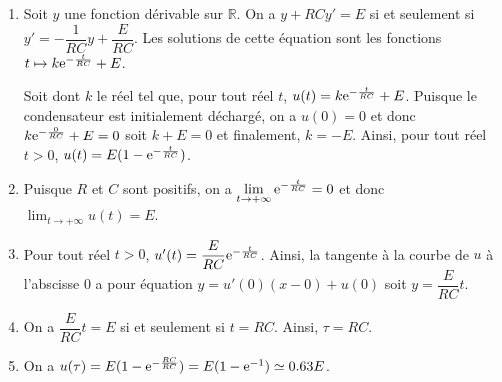 \documentclass[11pt,fleqn, openany]{book} %
\begin{document}
\begin{solution}\hspace{0pt}
\begin{enumerate}\item Soit \(y\) une fonction dérivable sur \(\mathbb{R}\). On a \(y+RCy'=E\) si et seulement si \(y'=-\dfrac{1}{RC}y+\dfrac{E}{RC}\). Les solutions de cette équation sont les fonctions \(t \mapsto k\mathrm{e}^{-\frac{t}{RC}}+E\). 

Soit dont \(k\) le réel tel que, pour tout réel \(t\), \(u(t)=k\mathrm{e}^{-\frac{t}{RC}}+E\). Puisque le condensateur est initialement déchargé, on a \(u(0)=0\) et donc \(k\mathrm{e}^{-\frac{0}{RC}}+E=0\) soit \(k+E=0\) et finalement, \(k=-E\). Ainsi, pour tout réel \(t>0\), \(u(t)=E(1-\mathrm{e}^{-\frac{t}{RC}})\).
	\item Puisque \(R\) et \(C\) sont positifs, on a \(\displaystyle\lim_{t \to + \infty}\mathrm{e}^{-\frac{t}{RC}}=0\) et donc \(\displaystyle\lim_{t \to +\infty}u(t)=E\).
	\item Pour tout réel \(t>0\), \(u'(t)=\dfrac{E}{RC}\mathrm{e}^{-\frac{t}{RC}}\). Ainsi, la tangente à la courbe de \(u\) à l'abscisse 0 a pour équation \(y=u'(0)(x-0)+u(0)\) soit \(y=\dfrac{E}{RC}t\).
	\item On a \(\dfrac{E}{RC}t=E\) si et seulement si \(t=RC\). Ainsi, \(\tau =RC\).
	\item On a \(u(\tau)= E(1-\mathrm{e}^{-\frac{RC}{RC}})=E(1-\mathrm{e}^{-1})\simeq0.63E\).\end{enumerate}

 \end{solution}
\end{document}
